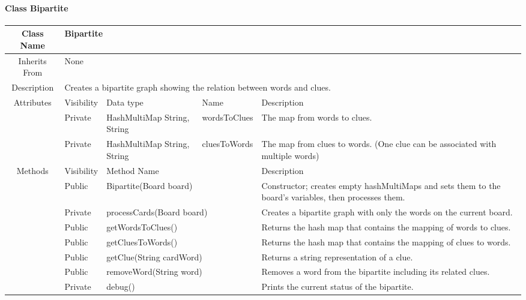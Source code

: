 \paragraph{Class Bipartite}\mbox{}
\begin{tabularx}{\textwidth}{|c||l|p{2.75cm}|l|X|}
    \hline
    \cellcolor{lightgray}Class Name & \multicolumn{4}{X|}{Bipartite}\\
    \hline
    \cellcolor{lightgray}Inherits From & \multicolumn{4}{X|}{None}\\
    \hline
    \cellcolor{lightgray}Description & \multicolumn{4}{p{12cm}|}{Creates a bipartite graph showing the relation between words and clues.}\\
    \hline\hline
    
    \cellcolor{lightgray}Attributes & \cellcolor{lightgray}Visibility & \cellcolor{lightgray}Data type & \cellcolor{lightgray}Name & \cellcolor{lightgray}Description\\\cline{2-5}
    \cellcolor{lightgray} & Private & HashMultiMap \textlangle{}String, String\textrangle{} & wordsToClues & The map from words to clues.\\
    \hline
    \cellcolor{lightgray} & Private & HashMultiMap \textlangle{}String, String\textrangle{} & cluesToWords & The map from clues to words. (One clue can be associated with multiple words)\\
    \hline\hline
    
    \cellcolor{lightgray}Methods & \cellcolor{lightgray}Visibility & \multicolumn{2}{l|}{\cellcolor{lightgray}Method Name} & \cellcolor{lightgray}Description\\\cline{2-5}
    \cellcolor{lightgray} & Public & \multicolumn{2}{l|}{Bipartite(Board board)} & Constructor; creates empty hashMultiMaps and sets them to the board's variables, then processes them.\\
    \hline
    \cellcolor{lightgray} & Private & \multicolumn{2}{l|}{processCards(Board board)} & Creates a bipartite graph with only the words on the current board.\\
    \hline
    \cellcolor{lightgray} & Public & \multicolumn{2}{l|}{getWordsToClues()} & Returns the hash map that contains the mapping of words to clues.\\
    \hline
    \cellcolor{lightgray} & Public & \multicolumn{2}{l|}{getCluesToWords()} & Returns the hash map that contains the mapping of clues to words.\\
    \hline
    \cellcolor{lightgray} & Public & \multicolumn{2}{l|}{getClue(String cardWord)} & Returns a string representation of a clue.\\
    \hline
    \cellcolor{lightgray} & Public & \multicolumn{2}{l|}{removeWord(String word)} & Removes a word from the bipartite including its related clues.\\
    \hline
    \cellcolor{lightgray} & Private & \multicolumn{2}{l|}{debug()} & Prints the current status of the bipartite.\\
    \hline
    
\end{tabularx}
